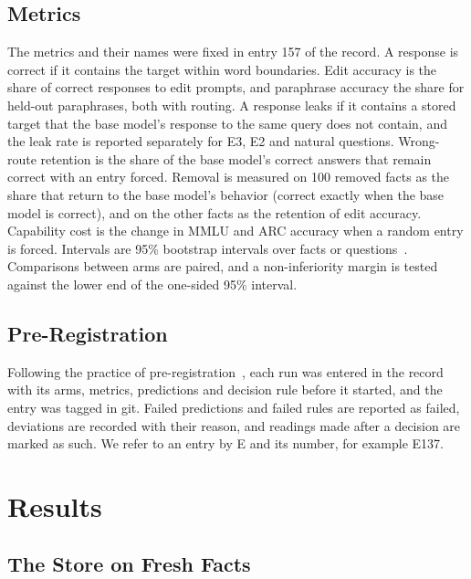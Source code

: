 \documentclass[journal,10pt]{IEEEtran}
\begin{document}
\subsection{Metrics}
The metrics and their names were fixed in entry 157 of the record. A response is correct if it contains the
target within word boundaries. Edit accuracy is the share of correct responses to edit prompts, and
paraphrase accuracy the share for held-out paraphrases, both with routing. A response leaks if it contains a
stored target that the base model's response to the same query does not contain, and the leak rate is
reported separately for E3, E2 and natural questions. Wrong-route retention is the share of the base model's
correct answers that remain correct with an entry forced. Removal is measured on 100 removed facts as the
share that return to the base model's behavior (correct exactly when the base model is correct), and on the
other facts as the retention of edit accuracy. Capability cost is the change in MMLU and ARC accuracy when a
random entry is forced. Intervals are 95\% bootstrap intervals over facts or
questions~\cite{efron1994bootstrap}. Comparisons between arms are paired, and a non-inferiority margin is
tested against the lower end of the one-sided 95\% interval.

\subsection{Pre-Registration}
Following the practice of pre-registration~\cite{nosek2018preregistration}, each run was entered in the
record with its arms, metrics, predictions and decision rule before it started, and the entry was tagged in
git. Failed predictions and failed rules are reported as failed, deviations are recorded with their reason,
and readings made after a decision are marked as such. We refer to an entry by E and its number, for example
E137.

\section{Results}
\label{sec:results}

\subsection{The Store on Fresh Facts}
\label{sec:fresh}
\end{document}
